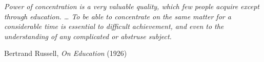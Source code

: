 %

\emph{Power of concentration is a very valuable quality, which few people acquire except through education. \ldots{} To be able to concentrate on the same matter for a considerable time is essential to difficult achievement, and even to the understanding of any complicated or abstruse subject.}

\begin{flushright}
Bertrand Russell, \emph{On Education} (1926)
\end{flushright}
